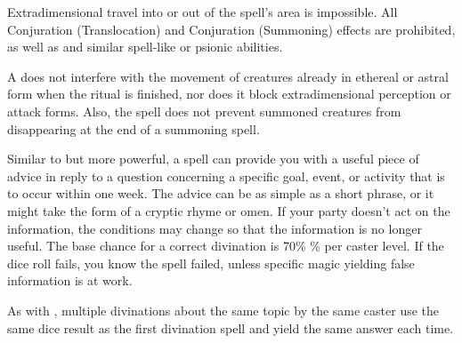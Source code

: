 \spelleffect Extradimensional travel into or out of the spell's area is impossible. All Conjuration (Translocation) and Conjuration (Summoning) effects are prohibited, as well as  and similar spell-like or psionic abilities.
\spellnotes \par A  does not interfere with the movement of creatures already in ethereal or astral form when the ritual is finished, nor does it block extradimensional perception or attack forms. Also, the spell does not prevent summoned creatures from disappearing at the end of a summoning spell.

\spelleffect Similar to  but more powerful, a  spell can provide you with a useful piece of advice in reply to a question concerning a specific goal, event, or activity that is to occur within one week. The advice can be as simple as a short phrase, or it might take the form of a cryptic rhyme or omen. If your party doesn't act on the information, the conditions may change so that the information is no longer useful. The base chance for a correct divination is 70\% \% per caster level. If the dice roll fails, you know the spell failed, unless specific magic yielding false information is at work.
\spellnotes \par As with , multiple divinations about the same topic by the same caster use the same dice result as the first divination spell and yield the same answer each time.

